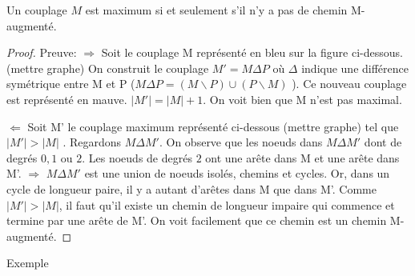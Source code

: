 \begin{mytheo} [Berge]
  Un couplage $M$ est maximum si et seulement s’il n’y a pas de chemin M-augmenté.
  \begin{proof}
     Preuve:
     $ \Longrightarrow $ Soit le couplage M représenté en bleu sur la figure ci-dessous. \addTODO{} (mettre graphe)
     On construit le couplage $ M' = M \Delta P$ où $\Delta$ indique une différence symétrique entre M et P ($ M \Delta P = ( M \backslash P) \cup ( P \backslash M)$ ). Ce nouveau couplage est représenté en mauve.
     $ |M'| = |M| + 1 $. On voit bien que M n'est pas maximal.


     $\Longleftarrow$ Soit M' le couplage maximum représenté ci-dessous \addTODO{} (mettre graphe)
      tel que $ |M'| > |M| $ . Regardons $ M \Delta M'$. On observe que les noeuds dans $ M \Delta M'$ dont de degrés $0,1$ ou $2$. Les noeuds de degrés $2$ ont une arête dans M et une arête dans M'. $\Rightarrow$ $ M \Delta M'$ est une union de noeuds isolés, chemins et cycles. Or, dans un cycle de longueur paire, il y a autant d'arêtes dans M que dans M'. Comme  $ |M'| > |M| $, il faut qu'il existe un chemin de longueur impaire qui commence et termine par une arête de M'. On voit facilement que ce chemin est un chemin M-augmenté.

  \end{proof}
\end{mytheo}
\begin{myexem}
  Exemple \addTODO
\end{myexem}

